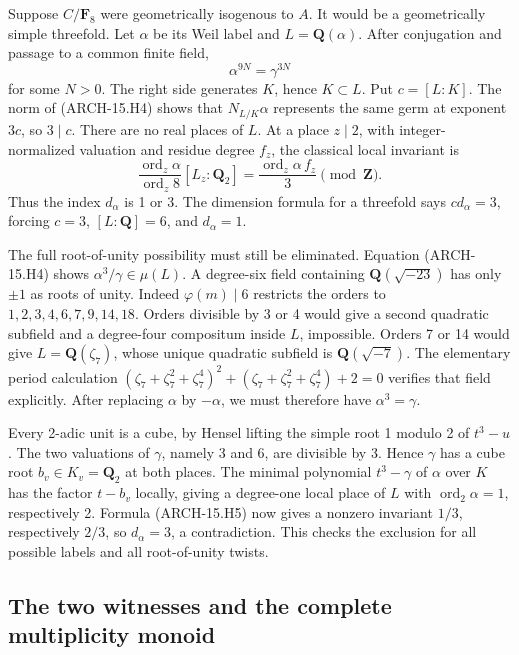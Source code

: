 Suppose \(C/\mathbf F_8\) were geometrically isogenous to \(A\).
It would be a geometrically simple threefold. Let \(\alpha\) be its
Weil label and \(L=\mathbf Q(\alpha)\). After conjugation and passage
to a common finite field,
\[
 \alpha^{9N}=\gamma^{3N}
 \tag{ARCH-15.H4}
\]
for some \(N>0\). The right side generates \(K\), hence \(K\subset L\).
Put \(c=[L:K]\). The norm of (ARCH-15.H4) shows that
\(N_{L/K}\alpha\) represents the same germ at exponent \(3c\), so
\(3\mid c\). There are no real places of \(L\). At a place \(z\mid2\),
with integer-normalized valuation and residue degree \(f_z\), the
classical local invariant is
\[
 \frac{\operatorname{ord}_z\alpha}{\operatorname{ord}_z8}
          [L_z:\mathbf Q_2]
 =\frac{\operatorname{ord}_z\alpha\,f_z}{3}
          \pmod {\mathbf Z}.
 \tag{ARCH-15.H5}
\]
Thus the index \(d_\alpha\) is 1 or 3. The dimension formula for a
threefold says \(c d_\alpha=3\), forcing \(c=3\), \([L:\mathbf Q]=6\),
and \(d_\alpha=1\).

The full root-of-unity possibility must still be eliminated.
Equation (ARCH-15.H4) shows \(\alpha^3/\gamma\in\mu(L)\). A
degree-six field containing \(\mathbf Q(\sqrt{-23})\) has only
\(\pm1\) as roots of unity. Indeed \(\varphi(m)\mid6\) restricts the
orders to \(1,2,3,4,6,7,9,14,18\). Orders divisible by 3 or 4 would
give a second quadratic subfield and a degree-four compositum inside
\(L\), impossible. Orders 7 or 14 would give
\(L=\mathbf Q(\zeta_7)\), whose unique quadratic subfield is
\(\mathbf Q(\sqrt{-7})\). The elementary period calculation
\((\zeta_7+\zeta_7^2+\zeta_7^4)^2+
(\zeta_7+\zeta_7^2+\zeta_7^4)+2=0\) verifies that field explicitly.
After replacing \(\alpha\) by \(-\alpha\), we must therefore have
\(\alpha^3=\gamma\).

Every 2-adic unit is a cube, by Hensel lifting the simple root 1
modulo 2 of \(t^3-u\). The two valuations of \(\gamma\), namely 3 and
6, are divisible by 3. Hence \(\gamma\) has a cube root
\(b_v\in K_v=\mathbf Q_2\) at both places. The minimal polynomial
\(t^3-\gamma\) of \(\alpha\) over \(K\) has the factor
\(t-b_v\) locally, giving a degree-one local place of \(L\) with
\(\operatorname{ord}_2\alpha=1\), respectively 2. Formula
(ARCH-15.H5) now gives a nonzero invariant \(1/3\), respectively
\(2/3\), so \(d_\alpha=3\), a contradiction. This checks the
exclusion for all possible labels and all root-of-unity twists.

\subsection{The two witnesses and the complete multiplicity monoid}

